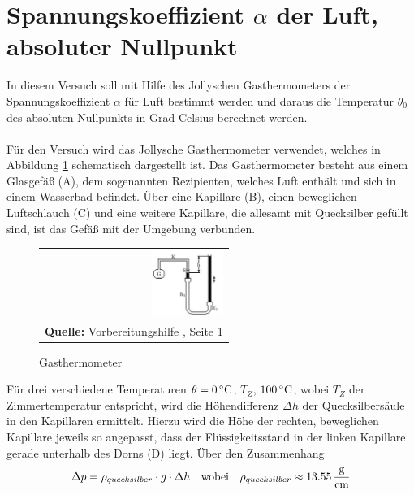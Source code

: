 \documentclass[a4paper,titlepage]{scrartcl}
\numberwithin{equation}{section}
\begin{document}
\section{Spannungskoeffizient $\alpha$ der Luft, absoluter Nullpunkt}
In diesem Versuch soll mit Hilfe des Jollyschen Gasthermometers der Spannungskoeffizient $\alpha$ für Luft bestimmt werden und daraus die Temperatur $\theta_0$ des absoluten Nullpunkts in Grad
Celsius berechnet werden.\\ \\
Für den Versuch wird das Jollysche Gasthermometer verwendet, welches in Abbildung \ref{fig:gasthermometer} schematisch dargestellt ist.
Das Gasthermometer besteht aus einem Glasgefäß (A), dem sogenannten Rezipienten, welches Luft enthält und sich in einem Wasserbad befindet. Über eine Kapillare (B), einen beweglichen Luftschlauch (C) und eine weitere Kapillare, die allesamt mit Quecksilber gefüllt sind, ist das Gefäß mit der Umgebung verbunden.
\begin{figure}[H]
	\centering
	\begin{tabular}{@{}r@{}}
		\includegraphics[width=0.4\textwidth]{bilder/gasthermometer.JPG}\\
		\footnotesize\sffamily\textbf{Quelle:} Vorbereitungshilfe \cite{vorbereitungshilfe}, Seite 1
	\end{tabular}
	\caption{Gasthermometer}
	\label{fig:gasthermometer}
\end{figure}
Für drei verschiedene Temperaturen $\theta=\unit[0]{^\circ C}$, $T_Z$, $\unit[100]{^\circ C}$, wobei $T_Z$ der Zimmertemperatur entspricht, wird die Höhendifferenz $\Delta h$ der Quecksilbersäule in den Kapillaren ermittelt. Hierzu wird die Höhe der rechten, beweglichen Kapillare jeweils so angepasst, dass der Flüssigkeitsstand
in der linken Kapillare gerade unterhalb des Dorns (D) liegt. Über den Zusammenhang
\begin{equation*}
\Delta p = \rho_{quecksilber} \cdot g \cdot \Delta h \quad \text{wobei} \quad \rho_{quecksilber} \approx \unit[13.55]{\frac{g}{cm}}
\end{equation*}
\end{document}
